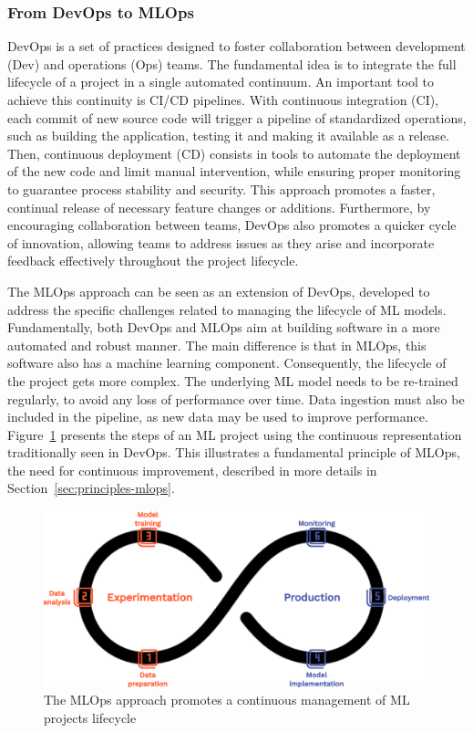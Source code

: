 \documentclass[graybox]{svmult}
\begin{document}
\subsubsection{From DevOps to MLOps}
\label{subsubsec:devops-mlops}

DevOps is a set of practices designed to foster collaboration between development (Dev) and operations (Ops) teams. The fundamental idea is to integrate the full lifecycle of a project in a single automated continuum. An important tool to achieve this continuity is CI/CD pipelines. With continuous integration (CI), each commit of new source code will trigger a pipeline of standardized operations, such as building the application, testing it and making it available as a release. Then, continuous deployment (CD) consists in tools to automate the deployment of the new code and limit manual intervention, while ensuring proper monitoring to guarantee process stability and security. This approach promotes a faster, continual release of necessary feature changes or additions. Furthermore, by encouraging collaboration between teams, DevOps also promotes a quicker cycle of innovation, allowing teams to address issues as they arise and incorporate feedback effectively throughout the project lifecycle.

The MLOps approach can be seen as an extension of DevOps, developed to address the specific challenges related to managing the lifecycle of ML models. Fundamentally, both DevOps and MLOps aim at building software in a more automated and robust manner. The main difference is that in MLOps, this software also has a machine learning component. Consequently, the lifecycle of the project gets more complex. The underlying ML model needs to be re-trained regularly, to avoid any loss of performance over time. Data ingestion must also be included in the pipeline, as new data may be used to improve performance. Figure~\ref{fig:mlops-cycle} presents the steps of an ML project using the continuous representation traditionally seen in DevOps. This illustrates a fundamental principle of MLOps, the need for continuous improvement, described in more details in Section~\ref{sec:principles-mlops}.

\begin{figure}[htbp]
    \centering
    \includegraphics[width=\textwidth]{figures/mlops-cycle.png}
    \caption{The MLOps approach promotes a continuous management of ML projects lifecycle}
    \label{fig:mlops-cycle}
\end{figure}
\end{document}
